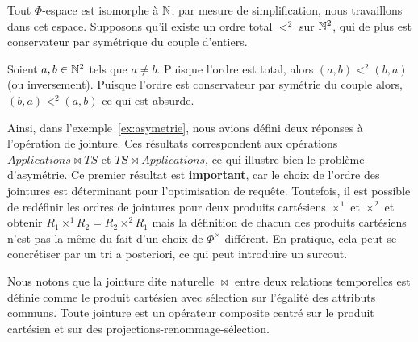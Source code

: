 \begin{demo}
    Tout $\Phi$-espace est isomorphe à $\mathbb{N}$, par mesure de simplification, nous travaillons dans cet espace. Supposons qu'il existe un ordre total $<^2$ sur $\mathbb{N}^2$, qui de plus est conservateur par symétrique du couple d'entiers.

    Soient $a,b\in \mathbb{N}^2$ tels que $a \neq b$. Puisque l'ordre est total, alors $(a,b) <^2 (b,a)$ (ou inversement). Puisque l'ordre est conservateur par symétrie du couple alors, $(b,a) <^2 (a,b)$ ce qui est absurde.
\end{demo}

Ainsi, dans l'exemple~\ref{ex:asymetrie}, nous avions défini deux réponses à l'opération de jointure. Ces résultats correspondent aux opérations $Applications\Join TS$ et $TS \Join Applications$, ce qui illustre bien le problème d'asymétrie. Ce premier résultat est \textbf{important}, car le choix de l'ordre des jointures est déterminant pour l'optimisation de requête. Toutefois, il est possible de redéfinir les ordres de jointures pour deux produits cartésiens $\times^1$ et $\times^2$ et obtenir $R_1 \times^1 R_2 = R_2 \times^2 R_1$ mais la définition de chacun des produits cartésiens n'est pas la même du fait d'un choix de $\Phi^\times$ différent. En pratique, cela peut se concrétiser par un tri a posteriori, ce qui peut introduire un surcout.

Nous notons que la jointure dite naturelle $\Join$ entre deux relations temporelles est définie comme le produit cartésien avec sélection sur l'égalité des attributs communs. Toute jointure est un opérateur composite centré sur le produit cartésien et sur des projections-renommage-sélection.

